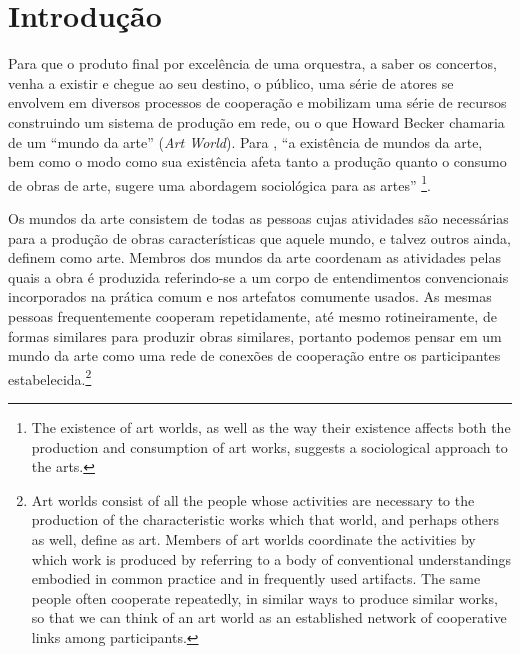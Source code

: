 \documentclass[a4paper, 12pt, openright, oneside, german, french, english, brazil]{abntex2}
\begin{document}
	\listofalgorithms
	\listoffigures
	\listoftables	
	\newpage
	\tableofcontents
	\textual
	
	\chapter*[Introdução]{Introdução}
	
	Para que o produto final por excelência de uma orquestra, a saber os concertos, venha a existir e chegue ao seu destino, o público, uma série de atores se envolvem em diversos processos de cooperação e mobilizam uma série de recursos construindo um sistema de produção em rede, ou o que Howard Becker chamaria de um ``mundo da arte'' (\textit{Art World}). Para , ``a existência de mundos da arte, bem como o modo como sua existência afeta tanto a produção quanto o consumo de obras de arte, sugere uma abordagem sociológica para as artes'' \footnote{The existence of art worlds, as well as the way their existence affects both the production and consumption of art works, suggests a sociological approach to the arts.}.
	
	\begin{citacao}
		Os mundos da arte consistem de todas as pessoas cujas atividades são necessárias para a produção de obras características que aquele mundo, e talvez outros ainda, definem como arte. Membros dos mundos da arte coordenam as atividades pelas quais a obra é produzida referindo-se a um corpo de entendimentos convencionais incorporados na prática comum e nos artefatos comumente usados. As mesmas pessoas frequentemente cooperam repetidamente, até mesmo rotineiramente, de formas similares para produzir obras similares, portanto podemos pensar em um mundo da arte como uma rede de conexões de cooperação entre os participantes estabelecida.\footnote{Art worlds consist of all the people whose activities are necessary to the production of the characteristic works which that world, and perhaps others as well, define as art. Members of art worlds coordinate the activities by which work is produced by referring to a body of conventional understandings embodied in common practice and in frequently used artifacts. The same people often cooperate repeatedly, in similar ways to produce similar works, so that we can think of an art world as an established network of cooperative links among participants.} \cite[p. 34-5]{becker2008art}
	\end{citacao}
	
\end{document}
